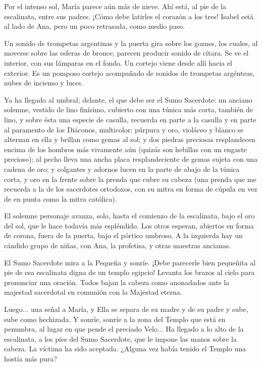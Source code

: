 \documentclass[12pt, twoside, openright]{book} %
\begin{document}
Por el intenso sol, María parece aún más de nieve. Ahí está, al pie de la escalinata, entre sus padres. ¡Cómo debe latirles el corazón a los tres! Isabel está al lado de Ana, pero un poco retrasada, como medio paso. 

Un sonido de trompetas argentinas y la puerta gira sobre los goznes, los cuales, al moverse sobre las esferas de bronce, parecen producir sonido de cítara. Se ve el interior, con sus lámparas en el fondo. Un cortejo viene desde allí hacia el exterior. Es un pomposo cortejo acompañado de sonidos de trompetas argénteas, nubes de incienso y luces. 

Ya ha llegado al umbral; delante, el que debe ser el Sumo Sacerdote: un anciano solemne, vestido de lino finísimo, cubierto con una túnica más corta, también de lino, y sobre ésta una especie de casulla, recuerda en parte a la casulla y en parte al paramento de los Diáconos, multicolor: púrpura y oro, violáceo y blanco se alternan en ella y brillan como gemas al sol; y dos piedras preciosas resplandecen encima de los hombros más vivamente aún (quizás son hebillas con un engaste precioso); al pecho lleva una ancha placa resplandeciente de gemas sujeta con una cadena de oro; y colgantes y adornos lucen en la parte de abajo de la túnica corta, y oro en la frente sobre la prenda que cubre su cabeza (una prenda que me recuerda a la de los sacerdotes ortodoxos, con su mitra en forma de cúpula en vez de en punta como la mitra católica). 

El solemne personaje avanza, solo, hasta el comienzo de la escalinata, bajo el oro del sol, que le hace todavía más espléndido. Los otros esperan, abiertos en forma de corona, fuera de la puerta, bajo el pórtico umbroso. A la izquierda hay un cándido grupo de niñas, con Ana, la profetisa, y otras maestras ancianas. 

El Sumo Sacerdote mira a la Pequeña y sonríe. ¡Debe parecerle bien pequeñita al pie de esa escalinata digna de un templo egipcio! Levanta los brazos al cielo para pronunciar una oración. Todos bajan la cabeza como anonadados ante la majestad sacerdotal en comunión con la Majestad eterna. 

Luego... una señal a María, y Ella se separa de su madre y de su padre y sube, sube como hechizada. Y sonríe, sonríe a la zona del Templo que está en penumbra, al lugar en que pende el preciado Velo... Ha llegado a lo alto de la escalinata, a los pies del Sumo Sacerdote, que le impone las manos sobre la cabeza. La víctima ha sido aceptada. ¿Alguna vez había tenido el Templo una hostia más pura? 
\end{document}
